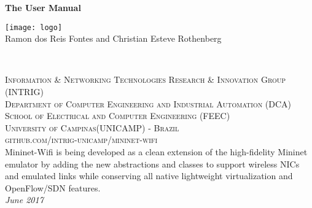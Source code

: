 \documentclass[11pt,fleqn]{book} %
\begin{document}
\begingroup
\thispagestyle{empty}


\vspace*{1cm}
\centering
\par\normalfont\fontsize{35}{35}\sffamily\selectfont
\centering
\textbf{The User Manual}\\
{\LARGE }\par %
\vspace*{4cm}
\centering
\texttt{[image: logo]} %
\\
\vspace*{3cm}
{\large Ramon dos Reis Fontes and Christian Esteve Rothenberg }\par %
\endgroup


\newpage
~\vfill
\thispagestyle{empty}


\noindent \textsc{Information \& Networking Technologies Research \& Innovation Group  (INTRIG)} \\
\noindent \textsc{Department of Computer Engineering and Industrial Automation (DCA)}\\
\noindent \textsc{School of Electrical and Computer Engineering (FEEC)}\\
\noindent \textsc{University of Campinas(UNICAMP) - Brazil}\\

\noindent \textsc{github.com/intrig-unicamp/mininet-wifi}\\ %

\noindent Mininet-Wifi is being developed as a clean extension of the  high-fidelity Mininet emulator by adding the new abstractions and classes to support wireless NICs and emulated links while conserving all native lightweight virtualization and OpenFlow/SDN features.\\ %

\noindent \textit{June 2017} %

\end{document}
